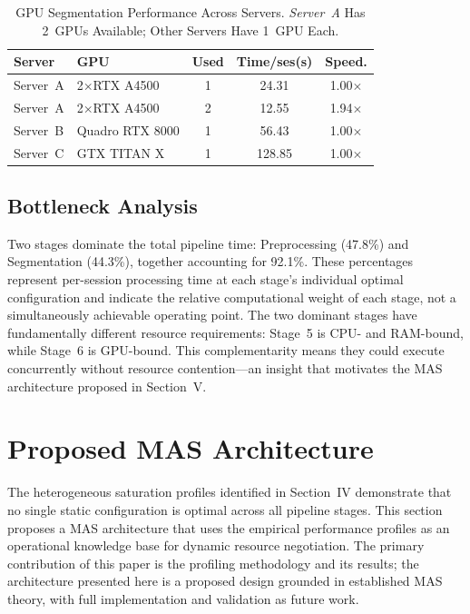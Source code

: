 \documentclass[conference]{IEEEtran}
\begin{document}
\begin{table}[t]
\centering
\caption{GPU Segmentation Performance Across Servers. \textit{Server~A} Has 2~GPUs Available; Other Servers Have 1~GPU Each.}
\label{tab:gpu}
\begin{tabular}{llccc}
\toprule
Server & GPU & Used & Time/ses(s) & Speed. \\
\midrule
Server~A & 2$\times$RTX A4500 & 1 & 24.31 & 1.00$\times$ \\
Server~A & 2$\times$RTX A4500 & 2 & 12.55 & 1.94$\times$ \\
Server~B & Quadro RTX 8000 & 1 & 56.43 & 1.00$\times$ \\
Server~C & GTX TITAN X & 1 & 128.85 & 1.00$\times$ \\
\bottomrule
\end{tabular}
\end{table}

\subsection{Bottleneck Analysis}

Two stages dominate the total pipeline time: Preprocessing (47.8\%) and Segmentation (44.3\%), together accounting for 92.1\%. These percentages represent per-session processing time at each stage's individual optimal configuration and indicate the relative computational weight of each stage, not a simultaneously achievable operating point. The two dominant stages have fundamentally different resource requirements: Stage~5 is CPU- and RAM-bound, while Stage~6 is GPU-bound. This complementarity means they could execute concurrently without resource contention---an insight that motivates the MAS architecture proposed in Section~V.

\section{Proposed MAS Architecture}

The heterogeneous saturation profiles identified in Section~IV demonstrate that no single static configuration is optimal across all pipeline stages. This section proposes a MAS architecture that uses the empirical performance profiles as an operational knowledge base for dynamic resource negotiation. The primary contribution of this paper is the profiling methodology and its results; the architecture presented here is a proposed design grounded in established MAS theory, with full implementation and validation as future work.
\end{document}
